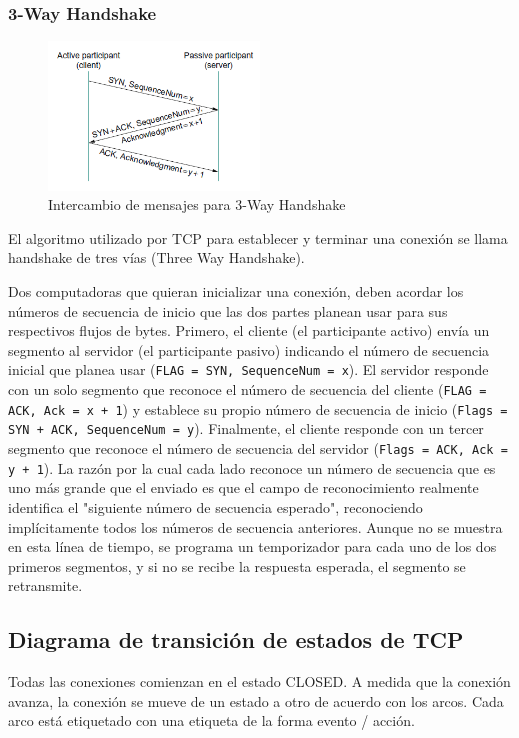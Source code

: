\subsubsection*{3-Way Handshake}
\begin{figure}[H]
	\centering
	\includegraphics[width=0.5\textwidth
]{images/three-way-handshake.png}
	\caption[Intercambio de mensajes para 3-Way Handshake]{Intercambio de mensajes para 3-Way Handshake}
	\label{fig:three-way-handshake}
\end{figure}
El algoritmo utilizado por TCP para establecer y terminar una conexión se llama handshake de tres vías (Three Way Handshake).

Dos computadoras que quieran inicializar una conexión, deben acordar los números de secuencia de inicio que las dos partes planean usar para sus respectivos flujos de bytes. Primero, el cliente (el participante activo) envía un segmento al servidor (el participante pasivo) indicando el número de secuencia inicial que planea usar (\texttt{FLAG = SYN, SequenceNum = x}). El servidor responde con un solo segmento que reconoce el número de secuencia del cliente (\texttt{FLAG = ACK, Ack = x + 1}) y establece su propio número de secuencia de inicio (\texttt{Flags = SYN + ACK, SequenceNum = y}). Finalmente, el cliente responde con un tercer segmento que reconoce el número de secuencia del servidor (\texttt{Flags = ACK, Ack = y + 1}). La razón por la cual cada lado reconoce un número de secuencia que es uno más grande que el enviado es que el campo de reconocimiento realmente identifica el "siguiente número de secuencia esperado", reconociendo implícitamente todos los números de secuencia anteriores. Aunque no se muestra en esta línea de tiempo, se programa un temporizador para cada uno de los dos primeros segmentos, y si no se recibe la respuesta esperada, el segmento se retransmite.

\subsection*{Diagrama de transición de estados de TCP}
Todas las conexiones comienzan en el estado CLOSED. A medida que la conexión avanza, la conexión se mueve de un estado a otro de acuerdo con los arcos. Cada arco está etiquetado con una etiqueta de la forma evento / acción.

